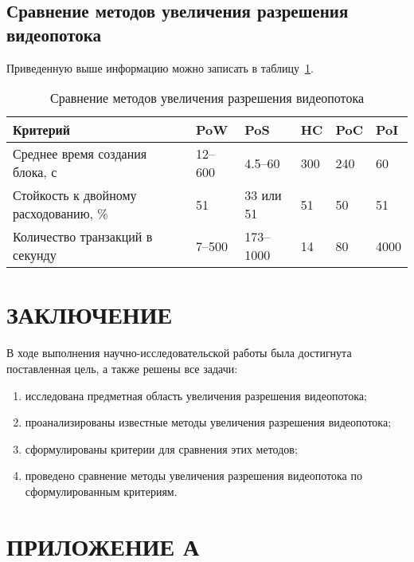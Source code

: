 \documentclass{bmstu}
\begin{document}
\section{Сравнение методов увеличения разрешения видеопотока}

Приведенную выше информацию можно записать в таблицу~\ref{tabular:comparison}. 

\begin{table}[H]
\caption{Сравнение методов увеличения разрешения видеопотока}
\label{tabular:comparison}
\begin{tabular}{|p{3cm}|p{2cm}|p{2.4cm}|p{}|p{}|p{}|}
\hline
\textbf{Критерий} & \textbf{PoW} & \textbf{PoS} & \textbf{HC} & \textbf{PoC} & \textbf{PoI}
\tabularnewline
\hline
Среднее время создания блока, с & 12--600 & 4.5--60 & 300 & 240 & 60
\tabularnewline
\hline
Стойкость к двойному расходованию, \% & 51 & 33 или 51 & 51 & 50 & 51
\tabularnewline
\hline
Количество транзакций в секунду & 7--500 & 173--1000 & 14 & 80 & 4000
\tabularnewline
\hline
\end{tabular}
\end{table}

{\centering \chapter*{ЗАКЛЮЧЕНИЕ}}

В ходе выполнения научно-исследовательской работы была достигнута поставленная цель, а также решены все задачи:
\begin{enumerate}
\item[1)] исследована предметная область увеличения разрешения видеопотока;
\item[2)] проанализированы известные методы увеличения разрешения видеопотока;
\item[3)] сформулированы критерии для сравнения этих методов;
\item[4)] проведено сравнение методы увеличения разрешения видеопотока по сформулированным критериям.
\end{enumerate}

{\centering {\center\printbibliography[title=СПИСОК ИСПОЛЬЗОВАННЫХ ИСТОЧНИКОВ]}}

{\centering \chapter*{ПРИЛОЖЕНИЕ А}}
\end{document}
